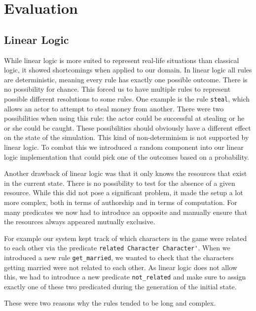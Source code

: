\section{Evaluation} \label{evaulation}

\subsection{Linear Logic}
While linear logic is more suited to represent real-life situations than classical logic, it showed shortcomings when applied to our domain.
In linear logic all rules are deterministic, meaning every rule has exactly one possible outcome.
There is no possibility for chance.
This forced us to have multiple rules to represent possible different resolutions to some rules.
One example is the rule \lstinline{steal}, which allows an actor to attempt to steal money from another.
There were two possibilities when using this rule: the actor could be successful at stealing or he or she could be caught.
These possibilities should obviously have a different effect on the state of the simulation.
This kind of non-determinism is not supported by linear logic.
To combat this we introduced a random component into our linear logic implementation that could pick one of the outcomes based on a probability.


Another drawback of linear logic was that it only knows the resources that exist in the current state.
There is no possibility to test for the absence of a given resource.
While this did not pose a significant problem, it made the setup a lot more complex, both in terms of authorship and in terms of computation.
For many predicates we now had to introduce an opposite and manually ensure that the resources always appeared mutually exclusive.

For example our system kept track of which characters in the game were related to each other via the predicate \lstinline{related Character Character'}.
When we introduced a new rule \lstinline{get_married}, we wanted to check that the characters getting married were not related to each other.
As linear logic does not allow this, we had to introduce a new predicate \lstinline{not_related} and make sure to assign exactly one of these two predicated during the generation of the initial state.

These were two reasons why the rules tended to be long and complex.

